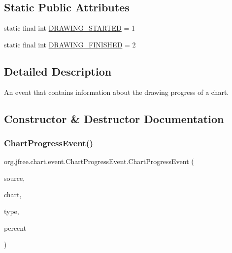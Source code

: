 \subsection*{Static Public Attributes}
\begin{DoxyCompactItemize}
\item 
static final int \mbox{\hyperlink{classorg_1_1jfree_1_1chart_1_1event_1_1_chart_progress_event_ad813d63050bd812e4bae3a2fc19f4472}{D\+R\+A\+W\+I\+N\+G\+\_\+\+S\+T\+A\+R\+T\+ED}} = 1
\item 
static final int \mbox{\hyperlink{classorg_1_1jfree_1_1chart_1_1event_1_1_chart_progress_event_acb211ad232555b85072efb49fd6ad75e}{D\+R\+A\+W\+I\+N\+G\+\_\+\+F\+I\+N\+I\+S\+H\+ED}} = 2
\end{DoxyCompactItemize}


\subsection{Detailed Description}
An event that contains information about the drawing progress of a chart. 

\subsection{Constructor \& Destructor Documentation}
\mbox{\label{classorg_1_1jfree_1_1chart_1_1event_1_1_chart_progress_event_a0511c6e9017fe400219cdeb447f499b2}} 
\subsubsection{\texorpdfstring{Chart\+Progress\+Event()}{ChartProgressEvent()}}
{\footnotesize\ttfamily org.\+jfree.\+chart.\+event.\+Chart\+Progress\+Event.\+Chart\+Progress\+Event (\begin{DoxyParamCaption}\item[{Object}]{source,  }\item[{\mbox{\hyperlink{classorg_1_1jfree_1_1chart_1_1_j_free_chart}{J\+Free\+Chart}}}]{chart,  }\item[{int}]{type,  }\item[{int}]{percent }\end{DoxyParamCaption})}

